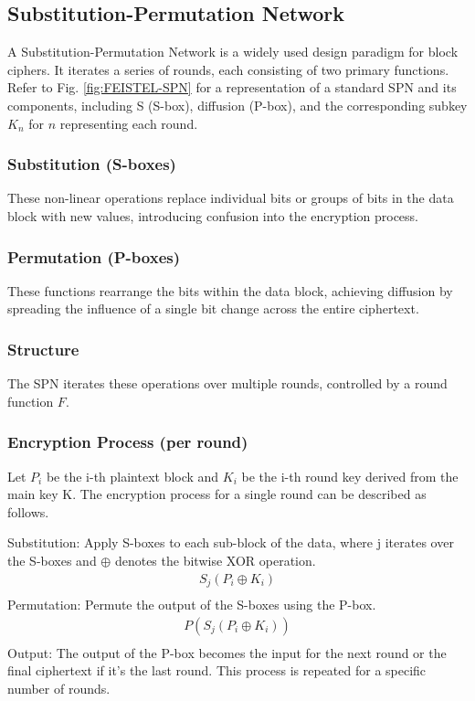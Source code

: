 \documentclass[conference]{IEEEtran}
\begin{document}
\subsection{Substitution-Permutation Network}
A Substitution-Permutation Network is a widely used design paradigm for block ciphers. It iterates a series of rounds, each consisting of two primary functions.
Refer to Fig. \ref{fig:FEISTEL-SPN} for a representation of a standard SPN and its components, including S (S-box), diffusion (P-box), and the corresponding subkey $K_n$ for $n$ representing each round.
\subsubsection{Substitution (S-boxes)}
These non-linear operations replace individual bits or groups of bits in the data block with new values, introducing confusion into the encryption process.
\subsubsection{Permutation (P-boxes)}
These functions rearrange the bits within the data block, achieving diffusion by spreading the influence of a single bit change across the entire ciphertext.
\subsubsection{Structure}

The SPN iterates these operations over multiple rounds, controlled by a round function $F$.
\subsubsection{Encryption Process (per round)}

Let $P_i$ be the i-th plaintext block and $K_i$ be the i-th round key derived from the main key K. The encryption process for a single round can be described as follows.

Substitution: Apply S-boxes to each sub-block of the data, where j iterates over the S-boxes and $\oplus$ denotes the bitwise XOR operation. 
\begin{align*}
    S_j(P_i \oplus K_i) \\
\end{align*}
Permutation: Permute the output of the S-boxes using the P-box.
\begin{align*}
    P(S_j(P_i \oplus K_i)) \\
\end{align*}
Output: The output of the P-box becomes the input for the next round or the final ciphertext if it's the last round.
This process is repeated for a specific number of rounds.
\end{document}
